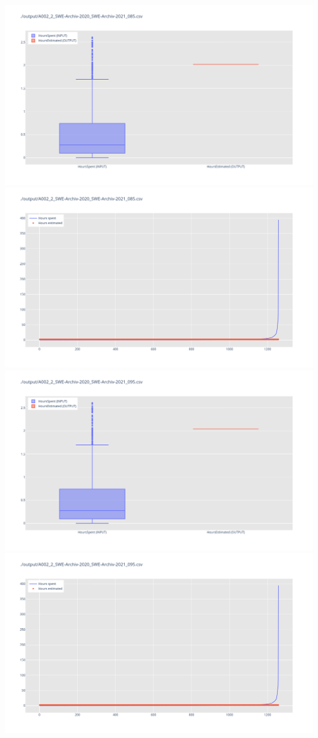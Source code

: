 \includegraphics[width=\textwidth]{Scripts/output/A002_2_SWE-Archiv-2020_SWE-Archiv-2021_085.csv.png}
\includegraphics[width=\textwidth]{Scripts/output/A002_2_SWE-Archiv-2020_SWE-Archiv-2021_085.csv.scatter.png}
\includegraphics[width=\textwidth]{Scripts/output/A002_2_SWE-Archiv-2020_SWE-Archiv-2021_095.csv.png}
\includegraphics[width=\textwidth]{Scripts/output/A002_2_SWE-Archiv-2020_SWE-Archiv-2021_095.csv.scatter.png}
